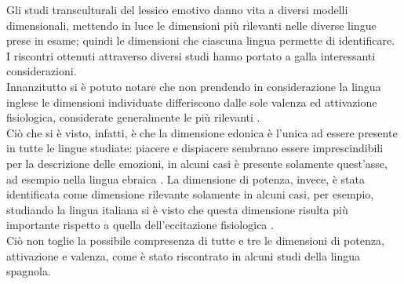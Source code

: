 Gli studi transculturali del lessico emotivo danno vita a diversi modelli dimensionali, mettendo in luce le dimensioni più rilevanti nelle diverse lingue prese in esame; quindi le dimensioni che ciascuna lingua permette di identificare. \\
I riscontri ottenuti attraverso diversi studi hanno portato a galla interessanti considerazioni. \\
Innanzitutto si è potuto notare che non prendendo in considerazione la lingua inglese le dimensioni individuate differiscono dalle sole valenza ed attivazione fisiologica, considerate generalmente le più rilevanti \parencite{Galati}. \\ 
Ciò che si è visto, infatti, è che la dimensione edonica è l'unica ad essere presente in tutte le lingue studiate: piacere e dispiacere sembrano essere imprescindibili per la descrizione delle emozioni, in alcuni casi è presente solamente quest'asse, ad esempio nella lingua ebraica \parencite{Fillenbaum}. 
La dimensione di potenza, invece, è stata identificata come dimensione rilevante solamente in alcuni casi, per esempio, studiando la lingua italiana si è visto che questa dimensione risulta più importante rispetto a quella dell'eccitazione fisiologica \parencite{Sini}. \\
Ciò non toglie la possibile compresenza di tutte e tre le dimensioni di potenza, attivazione e valenza, come è stato riscontrato in alcuni studi della lingua spagnola.


